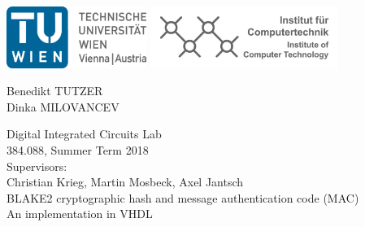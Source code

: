 \documentclass[%
	a4paper,
]
{article}
\begin{document}
%
\begin{titlepage}

	\begin{center}

	\includegraphics[height=2cm]{fig/logo-tu.png}%
	\hfill{}%
	\includegraphics[height=2cm]{fig/logo-ict.png}%
	

	\vspace{5em}


		\large
		Benedikt TUTZER\\
		Dinka MILOVANCEV\\
	

	\vspace{5em}

		{\huge Digital Integrated Circuits Lab}\\[1em]
		{\Large 384.088, Summer Term 2018} \\[2em]
		{\large Supervisors:\\[.5em]
			Christian Krieg, Martin Mosbeck, Axel Jantsch} \\[10em]

		{\Huge BLAKE2 cryptographic hash and message authentication code (MAC)}\\[2em]
		{\Large An implementation in VHDL}
		\\[8em]
	\end{center}


\begin{abstract}

		The task of our group was to implement \emph{BLAKE2b} hash function as
specified in \autocite{rfc7693}. The \emph{BLAKE2b} algorithm computation was
implemented using state machines, the implementation was syntactically correct
and synthesizable. The functional correctness was verified by using the
reference implementation given in C. The test bench compared the output of our
entity with the reference hash value for the same message input and reported
the result in terminal. For the message input we used the random data
generated by the Task 1 implementation. The \emph{BLAKE2b} hash function
entity is to be used as a component of \emph{Argon2} memory hard function
which should generate cryptographically secure keys from passwords as
specified in \autocite{irtf-cfrg-argon2-03}. The \emph{Argon2} function should
be implemented targeting \emph{Nexyx 4 DDR} board.
\end{abstract}
\end{titlepage}
%
%
\end{document}
